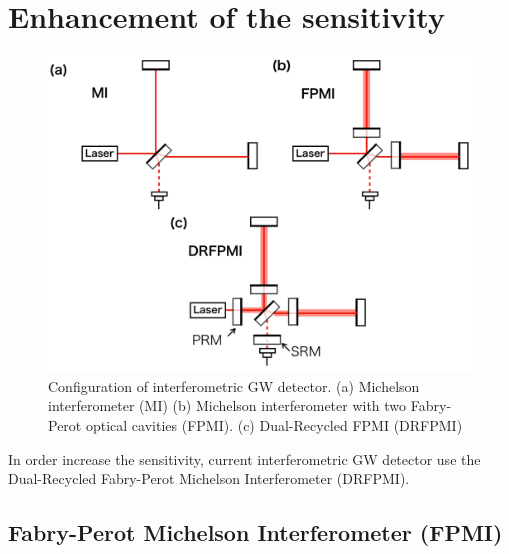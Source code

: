 \newpage
\section{Enhancement of the sensitivity}
\begin{figure}[h]
  \begin{center}   
    \includegraphics[width=14cm]{./img_chap1/img133.png}
    \caption{Configuration of interferometric GW detector. (a) Michelson interferometer (MI) (b) Michelson interferometer with two Fabry-Perot optical cavities (FPMI). (c) Dual-Recycled FPMI (DRFPMI)} \label{img:img133}
  \end{center}
\end{figure}
In order increase the sensitivity, current interferometric GW detector use the Dual-Recycled Fabry-Perot Michelson Interferometer (DRFPMI). 


\subsection{Fabry-Perot Michelson Interferometer (FPMI)}

